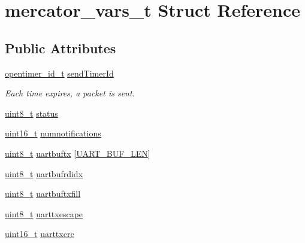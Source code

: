 \hypertarget{structmercator__vars__t}{}\section{mercator\+\_\+vars\+\_\+t Struct Reference}
\label{structmercator__vars__t}
\subsection*{Public Attributes}
\begin{DoxyCompactItemize}
\item 
\hyperlink{group___open_timers_gae5ca9e65d270cdfa4bc74008d96d69ab}{opentimer\+\_\+id\+\_\+t} \hyperlink{structmercator__vars__t_a37c913d40dc49d448cf02e35f72a5a83}{send\+Timer\+Id}
\begin{DoxyCompactList}\small\item\em Each time expires, a packet is sent. \end{DoxyCompactList}\item 
\hyperlink{_p_e___types_8h_aba7bc1797add20fe3efdf37ced1182c5}{uint8\+\_\+t} \hyperlink{structmercator__vars__t_aa7630f0959fd628fbd8e68210d6e9cbd}{status}
\item 
\hyperlink{_p_e___types_8h_a1f1825b69244eb3ad2c7165ddc99c956}{uint16\+\_\+t} \hyperlink{structmercator__vars__t_a5c249c8cf98a5ffbaded6922aba7aac1}{numnotifications}
\item 
\hyperlink{_p_e___types_8h_aba7bc1797add20fe3efdf37ced1182c5}{uint8\+\_\+t} \hyperlink{structmercator__vars__t_ae402a347ac5cfd93a074eac22b4861de}{uartbuftx} \mbox{[}\hyperlink{03oos__mercator_8c_aeec38153163908e428304567b3623e03}{U\+A\+R\+T\+\_\+\+B\+U\+F\+\_\+\+L\+EN}\mbox{]}
\item 
\hyperlink{_p_e___types_8h_aba7bc1797add20fe3efdf37ced1182c5}{uint8\+\_\+t} \hyperlink{structmercator__vars__t_a5a821ce8256f962279b0616e29fd2870}{uartbufrdidx}
\item 
\hyperlink{_p_e___types_8h_aba7bc1797add20fe3efdf37ced1182c5}{uint8\+\_\+t} \hyperlink{structmercator__vars__t_a2892b4d4768c2b75f2895314b73a6df7}{uartbuftxfill}
\item 
\hyperlink{_p_e___types_8h_aba7bc1797add20fe3efdf37ced1182c5}{uint8\+\_\+t} \hyperlink{structmercator__vars__t_aa446404bf6e13fa03a12fe17bd609b5b}{uarttxescape}
\item 
\hyperlink{_p_e___types_8h_a1f1825b69244eb3ad2c7165ddc99c956}{uint16\+\_\+t} \hyperlink{structmercator__vars__t_ae9a0e61d358789814d92a581a122faf6}{uarttxcrc}

\end{DoxyCompactItemize}

